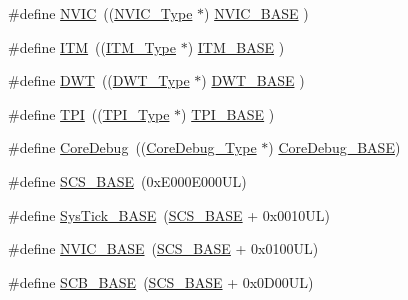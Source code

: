 \begin{DoxyCompactItemize}
\item 
\#define \hyperlink{group___c_m_s_i_s__core__base_gac8e97e8ce56ae9f57da1363a937f8a17}{N\+V\+IC}~((\hyperlink{struct_n_v_i_c___type}{N\+V\+I\+C\+\_\+\+Type}      $\ast$)     \hyperlink{group___c_m_s_i_s__core__base_gaa0288691785a5f868238e0468b39523d}{N\+V\+I\+C\+\_\+\+B\+A\+SE}     )
\item 
\#define \hyperlink{group___c_m_s_i_s__core__base_gabae7cdf882def602cb787bb039ff6a43}{I\+TM}~((\hyperlink{struct_i_t_m___type}{I\+T\+M\+\_\+\+Type}       $\ast$)     \hyperlink{group___c_m_s_i_s__core__base_gadd76251e412a195ec0a8f47227a8359e}{I\+T\+M\+\_\+\+B\+A\+SE}      )
\item 
\#define \hyperlink{group___c_m_s_i_s__core__base_gabbe5a060185e1d5afa3f85b14e10a6ce}{D\+WT}~((\hyperlink{struct_d_w_t___type}{D\+W\+T\+\_\+\+Type}       $\ast$)     \hyperlink{group___c_m_s_i_s__core__base_gafdab534f961bf8935eb456cb7700dcd2}{D\+W\+T\+\_\+\+B\+A\+SE}      )
\item 
\#define \hyperlink{group___c_m_s_i_s__core__base_ga8b4dd00016aed25a0ea54e9a9acd1239}{T\+PI}~((\hyperlink{struct_t_p_i___type}{T\+P\+I\+\_\+\+Type}       $\ast$)     \hyperlink{group___c_m_s_i_s__core__base_ga2b1eeff850a7e418844ca847145a1a68}{T\+P\+I\+\_\+\+B\+A\+SE}      )
\item 
\#define \hyperlink{group___c_m_s_i_s__core__base_gab6e30a2b802d9021619dbb0be7f5d63d}{Core\+Debug}~((\hyperlink{struct_core_debug___type}{Core\+Debug\+\_\+\+Type} $\ast$)     \hyperlink{group___c_m_s_i_s__core__base_ga680604dbcda9e9b31a1639fcffe5230b}{Core\+Debug\+\_\+\+B\+A\+SE})
\item 
\#define \hyperlink{group___c_m_s_i_s__core__base_ga3c14ed93192c8d9143322bbf77ebf770}{S\+C\+S\+\_\+\+B\+A\+SE}~(0x\+E000\+E000\+U\+L)
\item 
\#define \hyperlink{group___c_m_s_i_s__core__base_ga58effaac0b93006b756d33209e814646}{Sys\+Tick\+\_\+\+B\+A\+SE}~(\hyperlink{group___c_m_s_i_s__core__base_ga3c14ed93192c8d9143322bbf77ebf770}{S\+C\+S\+\_\+\+B\+A\+SE} +  0x0010\+U\+L)
\item 
\#define \hyperlink{group___c_m_s_i_s__core__base_gaa0288691785a5f868238e0468b39523d}{N\+V\+I\+C\+\_\+\+B\+A\+SE}~(\hyperlink{group___c_m_s_i_s__core__base_ga3c14ed93192c8d9143322bbf77ebf770}{S\+C\+S\+\_\+\+B\+A\+SE} +  0x0100\+U\+L)
\item 
\#define \hyperlink{group___c_m_s_i_s__core__base_gad55a7ddb8d4b2398b0c1cfec76c0d9fd}{S\+C\+B\+\_\+\+B\+A\+SE}~(\hyperlink{group___c_m_s_i_s__core__base_ga3c14ed93192c8d9143322bbf77ebf770}{S\+C\+S\+\_\+\+B\+A\+SE} +  0x0\+D00\+U\+L)

\end{DoxyCompactItemize}
